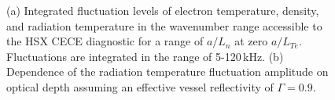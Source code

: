 \documentclass[%
 aip,
 amsmath,amssymb,
 reprint,%
]{revtex4-1}
\begin{document}
\begin{figure}[!htbp]
\centering
\begin{subfigure}[]{.49\textwidth}
  \centering
\end{subfigure}
\hfill
\begin{subfigure}[]{.49\textwidth}
  \centering
\end{subfigure}
\hfill
\caption{(a) Integrated fluctuation levels of electron temperature, density, and radiation temperature in the wavenumber range accessible to the HSX CECE diagnostic for a range of $a/L_n$ at zero $a/L_{Te}$. Fluctuations are integrated in the range of 5-120\,kHz. (b) Dependence of the radiation temperature fluctuation amplitude on optical depth assuming an effective vessel reflectivity of $\Gamma = 0.9$.}
\label{fig:omne_scan}
\end{figure}
\end{document}
